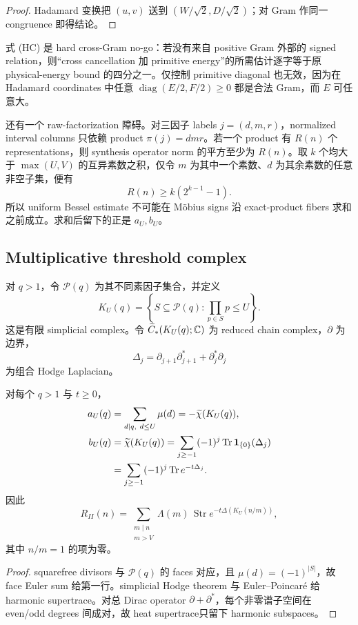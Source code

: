 \begin{proof}
Hadamard 变换把 $(u,v)$ 送到 $(W/\sqrt2,D/\sqrt2)$；对 Gram 作同一
congruence 即得结论。
\end{proof}

式 (HC) 是 hard cross-Gram no-go：若没有来自 positive Gram 外部的 signed
relation，则“cross cancellation 加 primitive energy”的所需估计逐字等于原
physical-energy bound 的四分之一。仅控制 primitive diagonal 也无效，因为在
Hadamard coordinates 中任意
$\operatorname{diag}(E/2,F/2)\geq0$ 都是合法 Gram，而 $E$ 可任意大。

还有一个 raw-factorization 障碍。对三因子 labels $j=(d,m,r)$，normalized
interval columns 只依赖 product $\pi(j)=dmr$。若一个 product 有 $R(n)$ 个
representations，则 synthesis operator norm 的平方至少为 $R(n)$。取 $k$ 个均大于
$\max(U,V)$ 的互异素数之积，仅令 $m$ 为其中一个素数、$d$ 为其余素数的任意
非空子集，便有
\[
 R(n)\geq k(2^{k-1}-1).
\]
所以 uniform Bessel estimate 不可能在 M\"obius signs 沿 exact-product fibers
求和之前成立。求和后留下的正是 $a_U,b_U$。

\subsection{Multiplicative threshold complex}

对 $q>1$，令 $\mathcal P(q)$ 为其不同素因子集合，并定义
\[
 K_U(q)=\left\{S\subseteq\mathcal P(q):\prod_{p\in S}p\leq U\right\}.
\]
这是有限 simplicial complex。令 $\widetilde C_*(K_U(q);\mathbb C)$ 为 reduced chain
complex，$\partial$ 为边界，
\[
 \Delta_j=\partial_{j+1}\partial_{j+1}^*
          +\partial_j^*\partial_j
\]
为组合 Hodge Laplacian。

\begin{theorem}\label{thm:mobius-hodge}
对每个 $q>1$ 与 $t\geq0$，
\begin{align*}
 a_U(q)&=\sum_{d\mid q,\ d\leq U}\mu(d)
       =-\widetilde\chi(K_U(q)),\\
 b_U(q)&=\widetilde\chi(K_U(q))
       =\sum_{j\geq-1}(-1)^j\operatorname{Tr}\mathbf1_{\{0\}}(\Delta_j)\\
       &=\sum_{j\geq-1}(-1)^j\operatorname{Tr} e^{-t\Delta_j}.
\end{align*}
因此
\[
 R_{II}(n)=\sum_{\substack{m\mid n\\m>V}}\Lambda(m)\,
 \operatorname{Str}e^{-t\Delta(K_U(n/m))},
\]
其中 $n/m=1$ 的项为零。
\end{theorem}

\begin{proof}
squarefree divisors 与 $\mathcal P(q)$ 的 faces 对应，且
$\mu(d)=(-1)^{|S|}$，故 face Euler sum 给第一行。simplicial Hodge theorem
与 Euler--Poincar\'e 给 harmonic supertrace。对总 Dirac operator
$\partial+\partial^*$，每个非零谱子空间在 even/odd degrees 间成对，故 heat
supertrace只留下 harmonic subspaces。
\end{proof}

